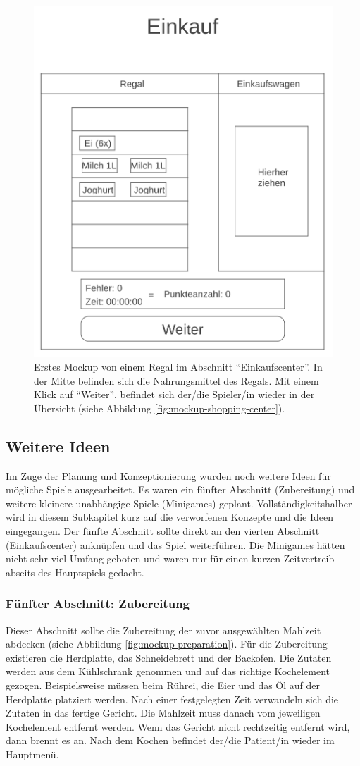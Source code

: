 \begin{figure}[H]
    \centering
	\includegraphics[width=0.5\linewidth]{figures/development/mockup/shopping-shelf.png}
	\caption{Erstes Mockup von einem Regal im Abschnitt \enquote{Einkaufscenter}. In der Mitte befinden sich die Nahrungsmittel des Regals. Mit einem Klick auf \enquote{Weiter}, befindet sich der/die Spieler/in wieder in der Übersicht (siehe Abbildung \ref{fig:mockup-shopping-center}).}
	\label{fig:mockup-shopping-shelf}
\end{figure}

\subsection{Weitere Ideen}
Im Zuge der Planung und Konzeptionierung wurden noch weitere Ideen für mögliche Spiele ausgearbeitet. Es waren ein fünfter Abschnitt (Zubereitung) und weitere kleinere unabhängige Spiele (Minigames) geplant. Vollständigkeitshalber wird in diesem Subkapitel kurz auf die verworfenen Konzepte und die Ideen eingegangen. Der fünfte Abschnitt sollte direkt an den vierten Abschnitt (Einkaufscenter) anknüpfen und das Spiel weiterführen. Die Minigames hätten nicht sehr viel Umfang geboten und waren nur für einen kurzen Zeitvertreib abseits des Hauptspiels gedacht.

\subsubsection{Fünfter Abschnitt: Zubereitung}
Dieser Abschnitt sollte die Zubereitung der zuvor ausgewählten Mahlzeit abdecken (siehe Abbildung \ref{fig:mockup-preparation}). Für die Zubereitung existieren die Herdplatte, das Schneidebrett und der Backofen. Die Zutaten werden aus dem Kühlschrank genommen und auf das richtige Kochelement gezogen. Beispielsweise müssen beim Rührei, die Eier und das Öl auf der Herdplatte platziert werden. Nach einer festgelegten Zeit verwandeln sich die Zutaten in das fertige Gericht. Die Mahlzeit muss danach vom jeweiligen Kochelement entfernt werden. Wenn das Gericht nicht rechtzeitig entfernt wird, dann brennt es an. Nach dem Kochen befindet der/die Patient/in wieder im Hauptmenü.

